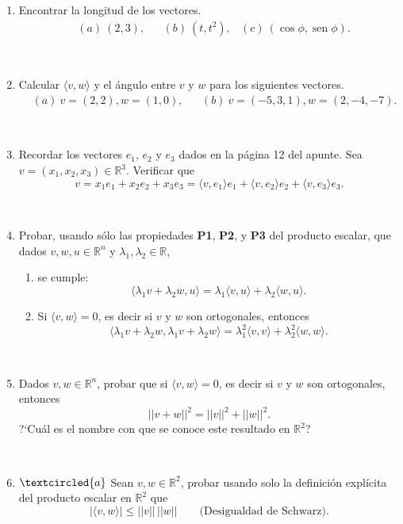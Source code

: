 \documentclass[12pt]{amsart}
\begin{document}
\begin{enumerate}
\



\
\item Encontrar la longitud de los vectores.
\begin{align*}
&(a) \ (2,3), && (b) \ (t,t^2), & (c) \ (\cos\phi,\operatorname{sen}\phi).
\end{align*}

\

\item Calcular $\langle v , w  \rangle$ y el {\'a}ngulo entre $v$ y $w$  para los siguientes vectores.
\begin{align*}
&(a) \ v=(2,2), w=(1,0), &&  (b) \  v=(-5,3,1), w=(2,-4,-7).
\end{align*}

\

\item Recordar los vectores $e_1$, $e_2$ y $e_3$ dados en la p\'agina 12 del apunte. Sea $v=(x_1,x_2,x_3)\in\mathbb{R}^3$.  Verificar que
$$v=x_1e_1+x_2e_2+x_3e_3=\langle v,e_1\rangle e_1+\langle v,e_2\rangle e_2+\langle v,e_3\rangle e_3.$$

\

\item Probar, usando s\'olo las propiedades \textbf{P1}, \textbf{P2}, y \textbf{P3} del producto escalar, que dados $v, w, u \in \mathbb R^n$ y $\lambda_1, \lambda_2 \in \mathbb R$,
\begin{enumerate}
	\item se cumple:
	\begin{equation*}
	\langle \lambda_1 v + \lambda_2 w , u  \rangle =  \lambda_1\langle v , u  \rangle +   \lambda_2\langle w , u  \rangle.
	\end{equation*}
	\item Si $\langle v , w  \rangle =0$, es decir si $v$ y $w$ son ortogonales,  entonces
	\begin{equation*}
		\langle \lambda_1 v + \lambda_2 w ,  \lambda_1 v + \lambda_2 w   \rangle =
		\lambda_1^2 \langle  v ,  v  \rangle + \lambda_2^2 \langle w,w  \rangle.
	\end{equation*}
\end{enumerate}


\


\item Dados $v, w\in \mathbb R^n$, probar que si  $\langle v , w  \rangle =0$, es decir si $v$ y $w$ son ortogonales,  entonces
	\begin{equation*}
	||v + w||^2 = ||v||^2 + ||w||^2.
	\end{equation*}
	?`Cu\'al es el nombre con que se conoce este resultado en $\mathbb R^2$?
	

\

\item\label{Schwarz} $\textcircled{a}$ Sean $v,w\in \mathbb R^2$, probar usando  solo la definici\'on explícita del producto escalar en $\mathbb R^2$ que
\begin{equation*}
	|\langle v , w  \rangle| \le ||v||\,||w|| \qquad \text{(Desigualdad de Schwarz).}
\end{equation*}

\end{enumerate}
\end{document}
